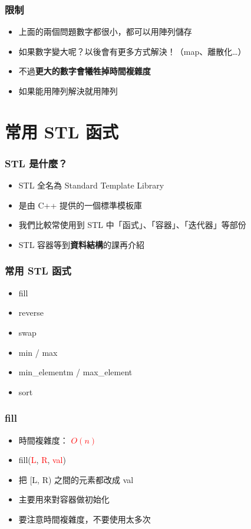 \documentclass[mathserif]{beamer}
\begin{document}
\begin{frame}
    \frametitle{限制}
    \begin{itemize}
        \item 上面的兩個問題數字都很小，都可以用陣列儲存
        \item 如果數字變大呢？以後會有更多方式解決！（map、離散化…）
        \item<2-> 不過\textbf{更大的數字會犧牲掉時間複雜度}
        \item<2-> 如果能用陣列解決就用陣列
    \end{itemize}
\end{frame}

\section{常用 STL 函式}

\begin{frame}
    \frametitle{STL 是什麼？}
    \begin{itemize}
        \item STL 全名為 Standard Template Library
        \item 是由 C++ 提供的一個標準模板庫
        \item 我們比較常使用到 STL 中「函式」、「容器」、「迭代器」等部份
        \vspace{0.5cm}
        \item STL 容器等到\textbf{資料結構}的課再介紹
    \end{itemize}
\end{frame}

\begin{frame}
    \frametitle{常用 STL 函式}
    \begin{itemize}
        \item fill
        \item reverse
        \item swap
        \item min / max
        \item min\_elementm / max\_element
        \item sort
    \end{itemize}
\end{frame}

\begin{frame}
    \frametitle{fill}
    \begin{itemize}
        \item 時間複雜度： \textcolor{red}{\textbf{$O(n)$}}
        \item fill(\textcolor{red}{L}, \textcolor{red}{R}, \textcolor{red}{val})
        \item 把 [L, R) 之間的元素都改成 val
        \vspace{0.5cm}
        \item 主要用來對容器做初始化
        \item 要注意時間複雜度，不要使用太多次
    \end{itemize}
\end{frame}
\end{document}
